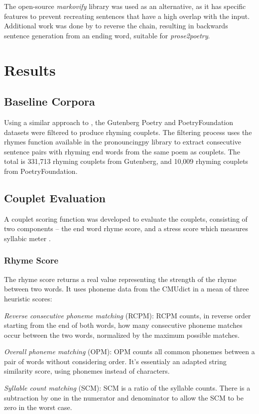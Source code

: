 \documentclass[11pt,a4paper]{article}
\newenvironment{tight_itemize}{
\begin{itemize}
\setlength{\itemsep}{0pt}
\setlength{\parskip}{0pt}
}{\end{itemize}}
\begin{document}
The open-source \textit{markovify} \cite{markovify} library was used as an alternative, as it has specific features to prevent recreating sentences that have a high overlap with the input. Additional work was done by \citet{markovifyfork} to reverse the chain, resulting in backwards sentence generation from an ending word, suitable for \textit{prose2poetry}.

\section{Results}
\label{sec:results}

\subsection{Baseline Corpora}
\label{sec:corpora}

Using a similar approach to \citet{cole}, the Gutenberg Poetry \cite{gutenbergpoetry} and PoetryFoundation \cite{poetryfoundationkaggle} datasets were filtered to produce rhyming couplets. The filtering process uses the rhymes function available in the pronouncingpy library to extract consecutive sentence pairs with rhyming end words from the same poem as couplets. The total is 331,713 rhyming couplets from Gutenberg, and 10,009 rhyming couplets from PoetryFoundation.

\subsection{Couplet Evaluation}
\label{sec:coupleteval}

A couplet scoring function was developed to evaluate the couplets, consisting of two components -- the end word rhyme score, and a stress score which measures syllabic meter \cite{meter_def}.

\subsubsection{Rhyme Score}
\label{sec:rhymescore}

The rhyme score returns a real value representing the strength of the rhyme between two words. It uses phoneme data from the CMUdict in a mean of three heuristic scores:
\begin{tight_itemize}
	\vspace{-0.5em}
	\item \textit{Reverse consecutive phoneme matching} (RCPM):
	RCPM counts, in reverse order starting from the end of both words, how many consecutive phoneme matches occur between the two words, normalized by the maximum possible matches.
	\item \textit{Overall phoneme matching} (OPM):
		OPM counts all common phonemes between a pair of words without considering order. It's essentialy an adapted \citet{ratcliff} string similarity score, using phonemes instead of characters.
	\item \textit{Syllable count matching} (SCM):
	SCM is a ratio of the syllable counts. There is a subtraction by one in the numerator and denominator to allow the SCM to be zero in the worst case.
\end{tight_itemize}
\end{document}
